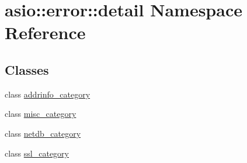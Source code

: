 \hypertarget{namespaceasio_1_1error_1_1detail}{}\section{asio\+:\+:error\+:\+:detail Namespace Reference}
\label{namespaceasio_1_1error_1_1detail}
\subsection*{Classes}
\begin{DoxyCompactItemize}
\item 
class \hyperlink{classasio_1_1error_1_1detail_1_1addrinfo__category}{addrinfo\+\_\+category}
\item 
class \hyperlink{classasio_1_1error_1_1detail_1_1misc__category}{misc\+\_\+category}
\item 
class \hyperlink{classasio_1_1error_1_1detail_1_1netdb__category}{netdb\+\_\+category}
\item 
class \hyperlink{classasio_1_1error_1_1detail_1_1ssl__category}{ssl\+\_\+category}
\end{DoxyCompactItemize}
